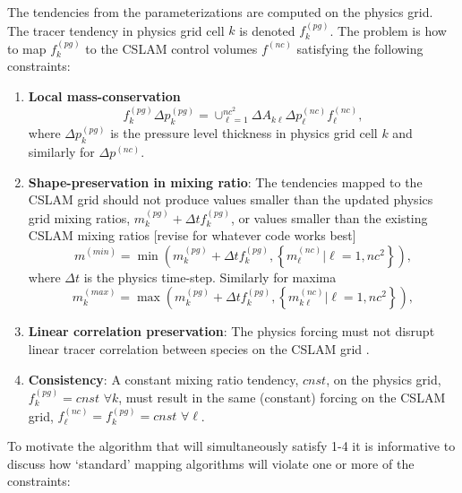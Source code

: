 The tendencies from the parameterizations are computed on the physics grid. The tracer tendency in physics grid cell $k$ is denoted $f_k^{(pg)}$. The problem is how to map $f_k^{(pg)}$ to the CSLAM control volumes $f^{(nc)}$ satisfying the following constraints:
\begin{enumerate}
\item {\bf{Local mass-conservation}}
\begin{equation}
f_k^{(pg)}\Delta p^{(pg)}_k=\cup_{\ell=1}^{nc^2}\Delta A_{k\ell}\Delta p^{(nc)}_\ell f^{(nc)}_\ell,
\end{equation}
where $\Delta p^{(pg)}_k$ is the pressure level thickness in physics grid cell $k$ and similarly for $\Delta p^{(nc)}$.
\item {\bf{Shape-preservation in mixing ratio}}: The tendencies mapped to the CSLAM grid should not produce values smaller than the updated physics grid mixing ratios, $m^{(pg)}_k+\Delta tf_k^{(pg)}$, or values smaller than the existing CSLAM mixing ratios [revise for whatever code works best]
\begin{equation}
m^{(min)}=\min \left( m^{(pg)}_k+\Delta t f_k^{(pg)},\left\{ m^{(nc)}_{\ell} |\ell=1,nc^2\right\} \right),
\end{equation}
where $\Delta t$ is the physics time-step. Similarly for maxima
\begin{equation}
m_k^{(max)}=\max \left( m^{(pg)}_k+\Delta t f_k^{(pg)},\left\{ m^{(nc)}_{k\ell} |\ell=1,nc^2\right\} \right),
\end{equation}
\item {\bf{Linear correlation preservation}}: The physics forcing must not disrupt linear tracer correlation between species on the CSLAM grid \citep[see, e.g., ][]{LT2011QJR}.
\item {\bf{Consistency}}: A constant mixing ratio tendency, $cnst$, on the physics grid, $f_k^{(pg)}=cnst$ $\forall k$, must result in the same (constant) forcing on the CSLAM grid, $f_\ell^{(nc)}=f_k^{(pg)}=cnst$ $\forall \ell$.
\end{enumerate}
To motivate the algorithm that will simultaneously satisfy 1-4 it is informative to discuss how `standard' mapping algorithms will violate one or more of the constraints:
